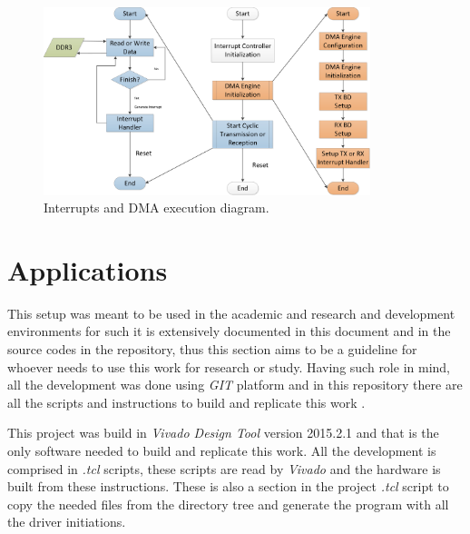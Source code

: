 \begin{figure}[htbp]
    \centering
    \includegraphics[width=0.85\textwidth]{./figures/dma_intc_driver}
    \caption{ Interrupts and DMA execution diagram.
    \label{fig:intcdmainit}}
\end{figure}

\section{Applications}
%
This setup was meant to be used in the academic and research and development
environments for such it is extensively documented in this document and in the
source codes in the repository, thus this section aims to be a guideline for
whoever needs to use this work for research or study. Having such role in mind,
all the development was done using \emph{GIT} platform and in this repository
there are all the scripts and instructions to build and replicate this work
\cite{web:gitproject}.

 This project was build in \emph{Vivado Design Tool} version 2015.2.1
\cite{xilinx:vivado} and that is the only software needed to build and
replicate this work. All the development is comprised in \emph{.tcl} scripts,
these scripts are read by \emph{Vivado} and the hardware is built from these
instructions. These is also a section in the project \emph{.tcl} script to copy
the needed files from the directory tree and generate the program with all the
driver initiations.

